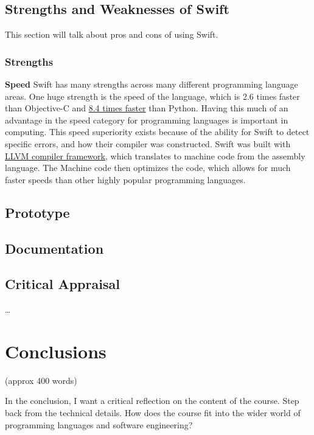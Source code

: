 \documentclass{article}
\theoremstyle{theorem}
\theoremstyle{definition}
\theoremstyle{remark}
\begin{document}
\subsection{Strengths and Weaknesses of Swift}
This section will talk about pros and cons of using Swift.
\subsubsection{Strengths}
\textbf{Speed}\newline
Swift has many strengths across many different programming language areas. One huge strength is the speed of the language, which is 2.6 times faster than Objective-C and \href{https://www.apple.com/swift/}{8.4 times faster} than Python. Having this much of an advantage in the speed category for programming languages is important in computing. This speed superiority exists because of the ability for Swift to detect specific errors, and how their compiler was constructed. Swift was built with \href{https://www.altexsoft.com/blog/engineering/the-good-and-the-bad-of-swift-programming-language/}{LLVM compiler framework}, which translates to machine code from the assembly language. The Machine code then optimizes the code, which allows for much faster speeds than other highly popular programming languages.
\subsection{Prototype}
\subsection{Documentation}
\subsection{Critical Appraisal}

\ldots

\section{Conclusions}\label{conclusions}

(approx 400 words)

In the conclusion, I want a critical reflection on the content of the course. Step back from the technical details. How does the course fit into the wider world of programming languages and software engineering?
\end{document}
